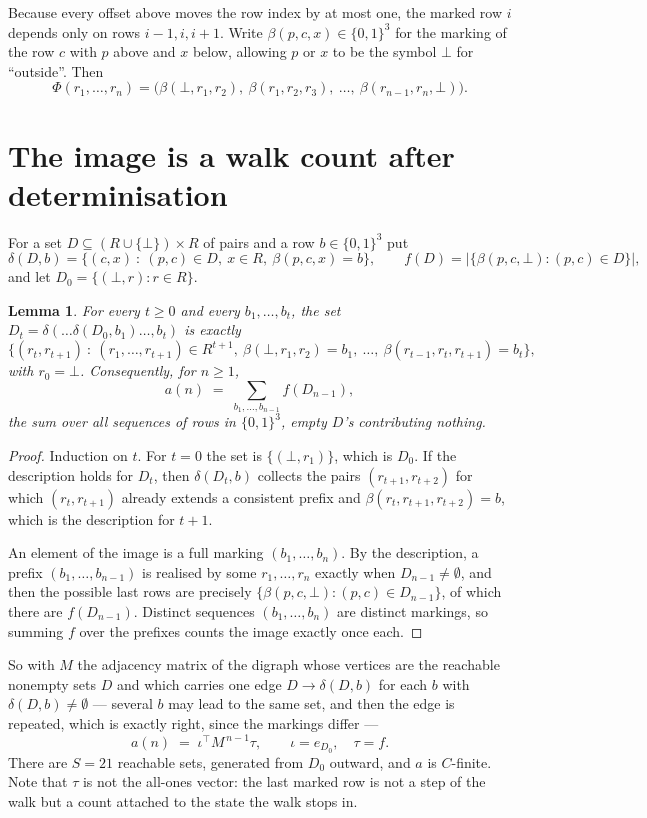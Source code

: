 \documentclass[11pt,a4paper]{article}
\theoremstyle{plain}
\newtheorem{lemma}[theorem]{Lemma}
\theoremstyle{definition}
\begin{document}
Because every offset above moves the row index by at most one, the marked row $i$ depends only
on rows $i-1,i,i+1$. Write $\beta(p,c,x)\in\{0,1\}^{3}$ for the marking of the row $c$
with $p$ above and $x$ below, allowing $p$ or $x$ to be the symbol $\bot$ for ``outside''.
Then
\[
\Phi(r_1,\dots,r_n)=\bigl(\beta(\bot,r_1,r_2),\ \beta(r_1,r_2,r_3),\ \dots,\
\beta(r_{n-1},r_n,\bot)\bigr).
\]

\section{The image is a walk count after determinisation}

For a set $D\subseteq(R\cup\{\bot\})\times R$ of pairs and a row $b\in\{0,1\}^{3}$ put
\[
\delta(D,b)=\{(c,x)\ :\ (p,c)\in D,\ x\in R,\ \beta(p,c,x)=b\},\qquad
f(D)=\bigl|\{\beta(p,c,\bot):(p,c)\in D\}\bigr| ,
\]
and let $D_0=\{(\bot,r):r\in R\}$.

\begin{lemma}\label{lem:det}
For every $t\ge0$ and every $b_1,\dots,b_t$, the set
$D_t=\delta(\dots\delta(D_0,b_1)\dots,b_t)$ is exactly
\[
\{(r_t,r_{t+1})\ :\ (r_1,\dots,r_{t+1})\in R^{t+1},\ \beta(\bot,r_1,r_2)=b_1,\ \dots,\
\beta(r_{t-1},r_t,r_{t+1})=b_t\} ,
\]
with $r_0=\bot$. Consequently, for $n\ge1$,
\[
a(n)\;=\;\sum_{b_1,\dots,b_{n-1}}f(D_{n-1}),
\]
the sum over all sequences of rows in $\{0,1\}^{3}$, empty $D$'s contributing nothing.
\end{lemma}

\begin{proof}
Induction on $t$. For $t=0$ the set is $\{(\bot,r_1)\}$, which is $D_0$. If the description
holds for $D_t$, then $\delta(D_t,b)$ collects the pairs $(r_{t+1},r_{t+2})$ for which
$(r_t,r_{t+1})$ already extends a consistent prefix and
$\beta(r_t,r_{t+1},r_{t+2})=b$, which is the description for $t+1$.

An element of the image is a full marking $(b_1,\dots,b_n)$. By the description, a prefix
$(b_1,\dots,b_{n-1})$ is realised by some $r_1,\dots,r_n$ exactly when $D_{n-1}\neq
\emptyset$, and then the possible last rows are precisely
$\{\beta(p,c,\bot):(p,c)\in D_{n-1}\}$, of which there are $f(D_{n-1})$. Distinct
sequences $(b_1,\dots,b_n)$ are distinct markings, so summing $f$ over the prefixes counts the
image exactly once each.
\end{proof}

So with $M$ the adjacency matrix of the digraph whose vertices are the reachable nonempty sets
$D$ and which carries one edge $D\to\delta(D,b)$ for each $b$ with $\delta(D,b)\neq\emptyset$
--- several $b$ may lead to the same set, and then the edge is repeated, which is exactly
right, since the markings differ ---
\[
a(n)\;=\;\iota^{\!\top}M^{\,n-1}\tau,\qquad \iota=e_{D_0},\quad \tau=f .
\]
There are $S=21$ reachable sets, generated from $D_0$ outward, and $a$ is $C$-finite. Note
that $\tau$ is not the all-ones vector: the last marked row is not a step of the walk but a
count attached to the state the walk stops in.
\end{document}
